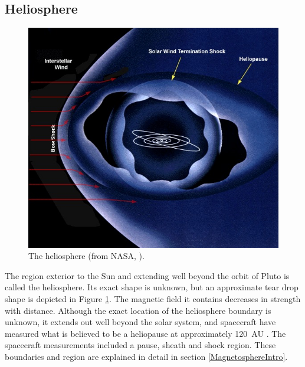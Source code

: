 \subsection{Heliosphere}
\begin{figure}
	\centering
	\includegraphics[scale=0.3]{images/NASA_Heliosphere.jpg}
	\caption{The heliosphere (from NASA, \citeyear{Heliosphere}).}
	\label{fig:NASAHelio}
	\figSpace
\end{figure}
The region exterior to the Sun and extending well beyond the orbit of Pluto is
called the heliosphere. Its exact shape is unknown, but an approximate tear
drop shape is depicted in Figure \ref{fig:NASAHelio}. The magnetic field it
contains decreases in strength with distance. Although the exact location of
the heliosphere boundary is unknown, it extends out well beyond the solar
system, and spacecraft have measured what is believed to be a heliopause at
approximately 120~AU \citep{Krimigis2009}. The spacecraft measurements included
a pause, sheath and shock region. These boundaries and region are explained in
detail in section \ref{MagnetosphereIntro}.

